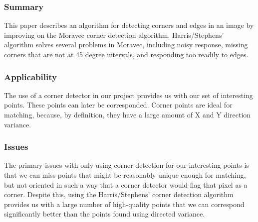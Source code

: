 \subsubsection{Summary}
This paper describes an algorithm for detecting corners and edges in an image by improving on the Moravec corner detection algorithm. Harris/Stephens' algorithm solves several problems in Moravec, including noisy response, missing corners that are not at 45 degree intervals, and responding too readily to edges. 

\subsubsection{Applicability}
The use of a corner detector in our project provides us with our set of interesting points. These points can later be corresponded. Corner points are ideal for matching, because, by definition, they have a large amount of X and Y direction variance. 

\subsubsection{Issues}
The primary issues with only using corner detection for our interesting points is that we can miss points that might be reasonably unique enough for matching, but not oriented in such a way that a corner detector would flag that pixel as a corner. Despite this, using the Harris/Stephens' corner detection algorithm provides us with a large number of high-quality points that we can correspond significantly better than the points found using directed variance. 